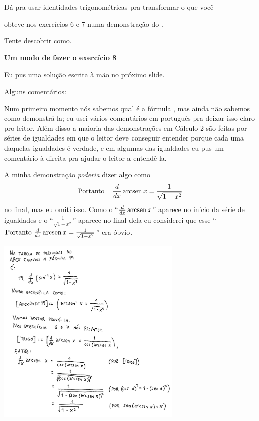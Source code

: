 \documentclass[oneside,12pt]{article}
\begin{document}
Dá pra usar identidades trigonométricas pra transformar o que você

obteve nos exercícios 6 e 7 numa demonstração do .

Tente descobrir como.


\newpage


{\bf Um modo de fazer o exercício 8}

Eu pus uma solução escrita à mão no próximo slide.

Alguns comentários:

\msk

Num primeiro momento nós sabemos qual é a fórmula ,
mas ainda não sabemos como demonstrá-la; eu usei vários comentários em
português pra deixar isso claro pro leitor. Além disso a maioria das
demonstrações em Cálculo 2 são feitas por séries de igualdades em que
o leitor deve conseguir entender porque cada uma daquelas igualdades é
verdade, e em algumas das igualdades eu pus um comentário à direita
pra ajudar o leitor a entendê-la.

\newpage

A minha demonstração {\sl poderia} dizer algo como
%
$$\text{Portanto \;\;\;} \frac{d}{dx} \operatorname{arcsen} x = \displaystyle \frac{1}{\sqrt{1-x^2}}$$
%
no final, mas eu omiti isso. Como o ``$\frac{d}{dx} \operatorname{arcsen} x$''
aparece no início da série de igualdades e o
``$\frac{1}{\sqrt{1-x^2}}$'' aparece no final dela eu considerei que
esse ``$\text{Portanto } \frac{d}{dx} \operatorname{arcsen} x =
\frac{1}{\sqrt{1-x^2}}$'' era óbvio.


\newpage


\vspace*{-1.25cm}
\includegraphics[height=9cm]{2020-2-C2/20210407_demonstracao.pdf}
\end{document}
